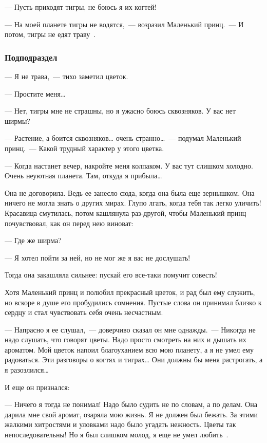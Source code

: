 \documentclass[14pt, a4paper, titlepage]{extarticle}
\begin{document}
--- Пусть приходят тигры, не боюсь я их когтей!

--- На моей планете тигры не водятся,~--- возразил Маленький принц.~--- И потом, тигры не едят траву~\cite{bib:prince}.

\subsubsection{Подподраздел}

--- Я не трава,~--- тихо заметил цветок.

--- Простите меня\dots{}

--- Нет, тигры мне не страшны, но я ужасно боюсь сквозняков. У вас нет ширмы?

--- Растение, а боится сквозняков\dots{} очень странно\dots{}~--- подумал Маленький принц.~--- Какой трудный характер у этого цветка.

--- Когда настанет вечер, накройте меня колпаком. У вас тут слишком холодно. Очень неуютная планета. Там, откуда я прибыла\dots{}

Она не договорила. Ведь ее занесло сюда, когда она была еще зернышком. Она ничего не могла знать о других мирах. Глупо лгать, когда тебя так легко уличить! Красавица смутилась, потом кашлянула раз-другой, чтобы Маленький принц почувствовал, как он перед нею виноват:

--- Где же ширма?

--- Я хотел пойти за ней, но не мог же я вас не дослушать!

Тогда она закашляла сильнее: пускай его все-таки помучит совесть!

Хотя Маленький принц и полюбил прекрасный цветок, и рад был ему служить, но вскоре в душе его пробудились сомнения. Пустые слова он принимал близко к сердцу и стал чувствовать себя очень несчастным.

--- Напрасно я ее слушал,~--- доверчиво сказал он мне однажды.~--- Никогда не надо слушать, что говорят цветы. Надо просто смотреть на них и дышать их ароматом. Мой цветок напоил благоуханием всю мою планету, а я не умел ему радоваться. Эти разговоры о когтях и тиграх\dots{} Они должны бы меня растрогать, а я разозлился\dots{}

И еще он признался:

--- Ничего я тогда не понимал! Надо было судить не по словам, а по делам. Она дарила мне свой аромат, озаряла мою жизнь. Я не должен был бежать. За этими жалкими хитростями и уловками надо было угадать нежность. Цветы так непоследовательны! Но я был слишком молод, я еще не умел любить~\cite{bib:prince}.
\end{document}
